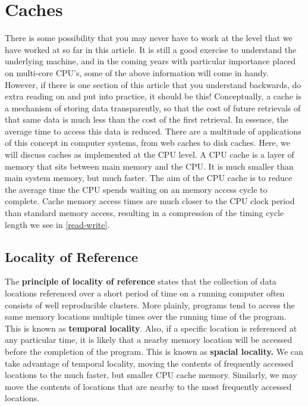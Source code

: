 \documentclass[10pt,a4paper]{article}
\begin{document}
\section{Caches}
There is some possibility that you may never have to work at the level that we have worked at so far in this article. It is still a good exercise to understand the underlying machine, and in the coming years with particular importance placed on multi-core CPU's, some of the above information will come in handy. However, if there is one section of this article that you understand backwards, do extra reading on and put into practice, it should be this!\newline\newline 
Conceptually, a cache is a mechanism of storing data transparently, so that the cost of future retrievals of that same data is much less than the cost of the first retrieval. In essence, the average time to access this data is reduced. There are a multitude of applications of this concept in computer systems, from web caches to disk caches. Here, we will discuss caches as implemented at the CPU level. \newline\newline
A CPU cache is a layer of memory that sits between main memory and the CPU. It is much smaller than main system memory, but much faster. The aim of the CPU cache is to reduce the average time the CPU spends waiting on an memory access cycle to complete. Cache memory access times are much closer to the CPU clock period than standard memory access, resulting in a compression of the timing cycle length we see in \ref{read-write}.
\subsection{Locality of Reference}
The \textbf{principle of locality of reference} states that the collection of data locations referenced over a short period of time on a running computer often consists of well reproducible clusters.  More plainly, programs tend to access the same memory locations multiple times over the running time of the program. This is known as \textbf{temporal locality}. Also, if a specific location is referenced at any particular time, it is likely that a nearby memory location will be accessed before the completion of the program. This is known as \textbf{spacial locality.} We can take advantage of temporal locality, moving the contents of frequently accessed locations to the much faster, but smaller CPU cache memory. Similarly, we may move the contents of locations that are nearby to the most frequently accessed locations. 
\end{document}
